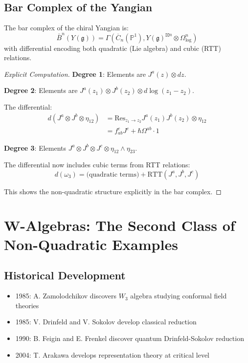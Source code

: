 \subsection{Bar Complex of the Yangian}

\begin{theorem}
The bar complex of the chiral Yangian is:
\[
\bar{B}^n(Y(\mathfrak{g})) = \Gamma\left(\overline{C}_n(\mathbb{P}^1), Y(\mathfrak{g})^{\boxtimes n} \otimes \Omega^n_{\log}\right)
\]
with differential encoding both quadratic (Lie algebra) and cubic (RTT) relations.
\end{theorem}

\begin{proof}[Explicit Computation]
\textbf{Degree 1}: Elements are $J^a(z) \otimes dz$.

\textbf{Degree 2}: Elements are $J^a(z_1) \otimes J^b(z_2) \otimes d\log(z_1 - z_2)$.

The differential:
\begin{align}
d(J^a \otimes J^b \otimes \eta_{12}) &= \text{Res}_{z_1 \to z_2} J^a(z_1)J^b(z_2) \otimes \eta_{12} \\
&= f_{ab}^c J^c + \hbar \Omega^{ab} \cdot 1
\end{align}

\textbf{Degree 3}: Elements $J^a \otimes J^b \otimes J^c \otimes \eta_{12} \wedge \eta_{23}$.

The differential now includes cubic terms from RTT relations:
\[
d(\omega_3) = \text{(quadratic terms)} + \text{RTT}(J^a, J^b, J^c)
\]

This shows the non-quadratic structure explicitly in the bar complex. \qedhere
\end{proof}




\section{W-Algebras: The Second Class of Non-Quadratic Examples}

\subsection{Historical Development}

\begin{itemize}
\item 1985: A. Zamolodchikov discovers $W_3$ algebra studying conformal field theories
\item 1985: V. Drinfeld and V. Sokolov develop classical reduction
\item 1990: B. Feigin and E. Frenkel discover quantum Drinfeld-Sokolov reduction
\item 2004: T. Arakawa develops representation theory at critical level
\end{itemize}

